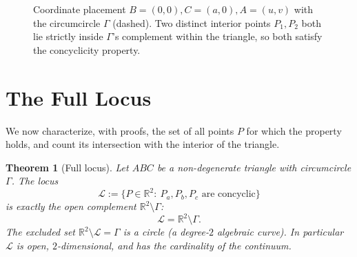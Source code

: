 \documentclass[11pt,a4paper]{article}
\newtheorem{theorem}{Theorem}[section]
\theoremstyle{definition}
\newcommand{\R}{\mathbb{R}}
\newcommand{\Pa}{P_{a}}
\newcommand{\Pb}{P_{b}}
\newcommand{\Pc}{P_{c}}
\newcommand{\circc}{\Gamma}
\begin{document}
\begin{figure}[h]
\centering
{}
\caption{Coordinate placement $B=(0,0),C=(a,0),A=(u,v)$ with the circumcircle $\circc$ (dashed). Two distinct interior points $P_{1},P_{2}$ both lie strictly inside $\circc$'s complement within the triangle, so both satisfy the concyclicity property.}
\label{fig:coords}
\end{figure}

\section{The Full Locus}\label{sec:locus}

We now characterize, with proofs, the set of all points $P$ for which the property holds, and count its intersection with the interior of the triangle.

\begin{theorem}[Full locus]\label{thm:locus}
Let $ABC$ be a non-degenerate triangle with circumcircle $\circc$. The locus
\[
\mathcal{L}:=\{P\in\R^{2}:\ \Pa,\Pb,\Pc\text{ are concyclic}\}
\]
is exactly the open complement $\R^{2}\setminus\circc$:
\begin{equation}\label{eq:locus}
\mathcal{L}=\R^{2}\setminus\circc.
\end{equation}
The excluded set $\R^{2}\setminus\mathcal{L}=\circc$ is a circle (a degree-$2$ algebraic curve). In particular $\mathcal{L}$ is open, $2$-dimensional, and has the cardinality of the continuum.
\end{theorem}
\end{document}
